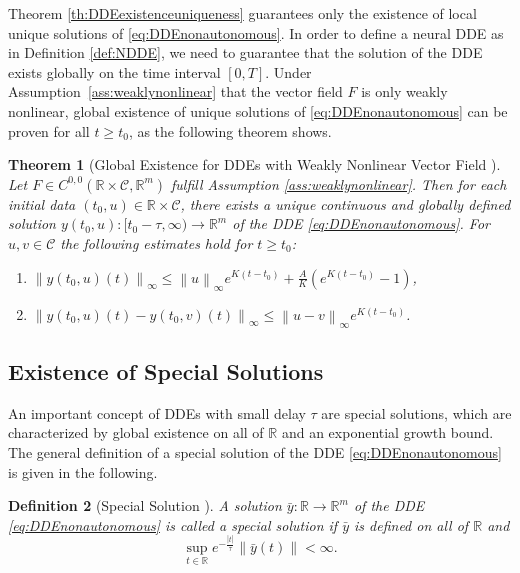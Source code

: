 \documentclass[10pt]{article}
\numberwithin{equation}{section}
\newtheorem{theorem}{Theorem}[section]
\newtheorem{definition}[theorem]{Definition}
\newcommand\norm[1]{\left\lVert#1\right\rVert}
\newcommand\abs[1]{\left\lvert#1\right\rvert}
\begin{document}
	
	Theorem \ref{th:DDEexistenceuniqueness} guarantees only the existence of local unique solutions of \eqref{eq:DDEnonautonomous}. In order to define a neural DDE as in Definition \ref{def:NDDE}, we need to guarantee that the solution of the DDE exists globally on the time interval $[0,T]$. Under Assumption~\ref{ass:weaklynonlinear} that the vector field $F$ is only weakly nonlinear, global existence of unique solutions of \eqref{eq:DDEnonautonomous} can be proven for all $t \geq t_0$, as the following theorem shows.
	
	\begin{theorem}[Global Existence for DDEs with Weakly Nonlinear Vector Field \cite{Driver1962,Driver1968}] \label{th:globalexistence}
		Let $F\in C^{0,0}(\mathbb{R}\times \mathcal{C}, \mathbb{R}^m)$ fulfill Assumption \ref{ass:weaklynonlinear}. Then for each initial data $(t_0,u) \in \mathbb{R}\times \mathcal{C}$, there exists a unique continuous and globally defined solution $y(t_0,u): [t_0-\tau,\infty)\rightarrow \mathbb{R}^m$ of the DDE \eqref{eq:DDEnonautonomous}. For $u,v\in \mathcal{C}$ the following estimates hold for $t \geq t_0$:
		\begin{enumerate}[label=(\alph*), font=\normalfont]
			\item \quad $\norm{y(t_0,u)(t)}_\infty \leq \norm{u}_\infty e^{K(t-t_0)} + \frac{A}{K}\left(e^{K(t-t_0)}-1\right)$,
			\item \quad $\norm{y(t_0,u)(t)-y(t_0,v)(t)}_\infty \leq \norm{u-v}_\infty e^{K(t-t_0)}$.
		\end{enumerate}
	\end{theorem}
	
	
	
	\subsection{Existence of Special Solutions}
	\label{sec:specialsolutions}
	
	An important concept of DDEs with small delay $\tau$ are special solutions, which are characterized by global existence on all of $\mathbb{R}$ and an exponential growth bound. The general definition of a special solution of the DDE \eqref{eq:DDEnonautonomous} is given in the following. 
	
	\begin{definition}[Special Solution \cite{Chicone2003}] \label{def:specialsolution}
		A solution $\bar{y}:\mathbb{R}\rightarrow \mathbb{R}^m$ of the DDE \eqref{eq:DDEnonautonomous} is called a special solution if $\bar{y}$ is defined on all of $\mathbb{R}$ and 
		\begin{equation}\label{eq:growthcondition}
			\sup_{t \in \mathbb{R}} e^{-\frac{\abs{t}}{\tau} } \norm{\bar{y}(t)} < \infty.
		\end{equation}
	\end{definition} 
	
\end{document}
